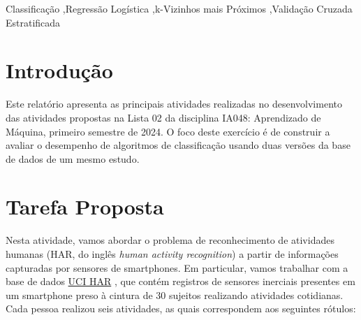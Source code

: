 \documentclass[final,5p]{elsarticle}
\numberwithin{equation}{section}
\begin{document}
\begin{frontmatter}

\begin{keyword}
    Classificação \sep Regressão Logística \sep k-Vizinhos mais Próximos \sep Validação Cruzada Estratificada



\end{keyword}

\end{frontmatter}

\section{Introdução}

    Este relatório apresenta as principais atividades realizadas no desenvolvimento das atividades propostas na Lista 02 da disciplina IA048: Aprendizado de Máquina, primeiro semestre de 2024. O foco deste exercício é de construir a avaliar o desempenho de algoritmos de classificação usando duas versões da base de dados de um mesmo estudo.

\section{Tarefa Proposta}

    Nesta atividade, vamos abordar o problema de reconhecimento de atividades humanas (HAR, do inglês \emph{human activity recognition}) a partir de informações capturadas por sensores de smartphones. Em particular, vamos trabalhar com a base de dados \href{https://archive.ics.uci.edu/dataset/240/human+activity+recognition+using+smartphones}{UCI HAR} \cite{anguita2013public}, que contém registros de sensores inerciais presentes em um smartphone preso à cintura de 30 sujeitos realizando atividades cotidianas. Cada pessoa realizou seis atividades, as quais correspondem aos seguintes rótulos:
\end{document}
